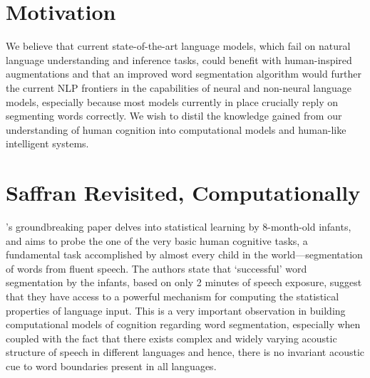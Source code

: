 \documentclass{article}
\begin{document}
\section{Motivation}
We believe that
current state-of-the-art language models, which fail on natural language understanding and inference tasks, could benefit with human-inspired augmentations and that an improved word segmentation algorithm would further the current NLP frontiers in the capabilities of neural and non-neural language models, especially because most models currently in place crucially reply on segmenting words correctly. We wish to distil the knowledge gained from our understanding of human cognition into computational models and human-like intelligent systems.




\section{Saffran Revisited, Computationally}
\citet{Saffran1996}'s groundbreaking paper delves into statistical learning by 8-month-old infants, and aims to probe the one of the very basic human cognitive tasks, a fundamental task accomplished by almost every child in the world---segmentation of words from fluent speech. The authors state that `successful' word segmentation by the infants, based on only 2 minutes of speech exposure, suggest that they have access to a powerful mechanism for computing the statistical properties of language input. This is a very important observation in building computational models of cognition regarding word segmentation, especially when coupled with the fact that there exists complex and widely varying acoustic structure of speech in different languages and hence, there is no invariant acoustic cue to word boundaries present in all languages.
\end{document}
